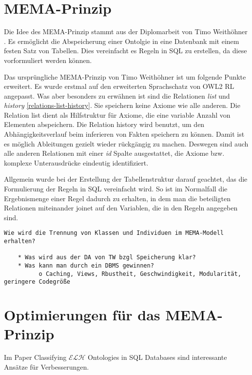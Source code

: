 \section{MEMA-Prinzip}
Die Idee des MEMA-Prinzip stammt aus der Diplomarbeit von Timo Weithöhner \cite{Weithoehner}. Es ermöglicht die Abspeicherung einer Ontolgie in eine Datenbank mit einem festen Satz von Tabellen. Dies vereinfacht es Regeln in SQL zu erstellen, da diese vorformuliert werden können.

Das ursprüngliche MEMA-Prinzip von Timo Weithöhner ist um folgende Punkte erweitert.
Es wurde erstmal auf den erweiterten Sprachschatz von OWL2 RL angepasst. Was aber besonders zu erwähnen ist sind die Relationen \emph{list} und \emph{history} \ref{relations-list-history}. Sie speichern keine Axiome wie alle anderen. Die Relation list dient als Hilfstruktur für Axiome, die eine variable Anzahl von Elementen abspeichern. Die Relation history wird benutzt, um den Abhängigkeitsverlauf beim inferieren von Fakten speichern zu können. Damit ist es möglich Ableitungen gezielt wieder rückgängig zu machen. Deswegen sind auch alle anderen Relationen mit einer \emph{id} Spalte ausgestattet, die Axiome bzw. komplexe Unterausdrücke eindeutig identifiziert.

Allgemein wurde bei der Erstellung der Tabellenstruktur darauf geachtet, das die Formulierung der Regeln in SQL vereinfacht wird. So ist im Normalfall die Ergebnismenge einer Regel dadurch zu erhalten, in dem man die beteiligten Relationen miteinander joinet auf den Variablen, die in den Regeln angegeben sind.


\begin{verbatim}
Wie wird die Trennung von Klassen und Individuen im MEMA-Modell erhalten?

    * Was wird aus der DA von TW bzgl Speicherung klar?
    * Was kann man durch ein DBMS gewinnen?
          o Caching, Views, Rbustheit, Geschwindigkeit, Modularität, geringere Codegröße 

\end{verbatim}

\section{Optimierungen für das MEMA-Prinzip}

Im Paper Classifying $\mathcal{ELH}$ Ontologies in SQL Databases \cite{Delaitre2009} sind interessante Ansätze für Verbesserungen.

